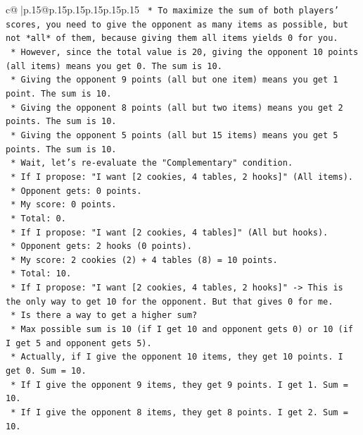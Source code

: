 \documentclass{article}
\begin{document}
{\begin{supertabular}{c@{$\;$}|p{.15\linewidth}@{}p{.15\linewidth}p{.15\linewidth}p{.15\linewidth}p{.15\linewidth}p{.15\linewidth}}
{{{\texttt{    *   To maximize the sum of both players' scores, you need to give the opponent as many items as possible, but not *all* of them, because giving them all items yields 0 for you.} \\
\texttt{    *   However, since the total value is 20, giving the opponent 10 points (all items) means you get 0. The sum is 10.} \\
\texttt{    *   Giving the opponent 9 points (all but one item) means you get 1 point. The sum is 10.} \\
\texttt{    *   Giving the opponent 8 points (all but two items) means you get 2 points. The sum is 10.} \\
\texttt{    *   Giving the opponent 5 points (all but 15 items) means you get 5 points. The sum is 10.} \\
\texttt{    *   Wait, let's re{-}evaluate the "Complementary" condition.} \\
\texttt{    *   If I propose: "I want {[}2 cookies, 4 tables, 2 hooks{]}" (All items).} \\
\texttt{        *   Opponent gets: 0 points.} \\
\texttt{        *   My score: 0 points.} \\
\texttt{        *   Total: 0.} \\
\texttt{    *   If I propose: "I want {[}2 cookies, 4 tables{]}" (All but hooks).} \\
\texttt{        *   Opponent gets: 2 hooks (0 points).} \\
\texttt{        *   My score: 2 cookies (2) + 4 tables (8) = 10 points.} \\
\texttt{        *   Total: 10.} \\
\texttt{    *   If I propose: "I want {[}2 cookies, 4 tables, 2 hooks{]}" {-}> This is the only way to get 10 for the opponent. But that gives 0 for me.} \\
\texttt{    *   Is there a way to get a higher sum?} \\
\texttt{        *   Max possible sum is 10 (if I get 10 and opponent gets 0) or 10 (if I get 5 and opponent gets 5).} \\
\texttt{        *   Actually, if I give the opponent 10 items, they get 10 points. I get 0. Sum = 10.} \\
\texttt{        *   If I give the opponent 9 items, they get 9 points. I get 1. Sum = 10.} \\
\texttt{        *   If I give the opponent 8 items, they get 8 points. I get 2. Sum = 10.} \\
}}}
\end{supertabular}}
\end{document}
